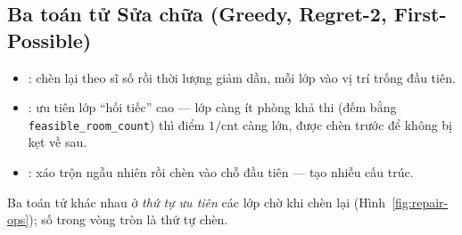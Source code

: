 \subsection{Ba toán tử Sửa chữa (Greedy, Regret-2, First-Possible)}
\begin{itemize}
  \item {}: chèn lại theo sĩ số rồi thời lượng giảm dần, mỗi lớp vào vị
  trí trống đầu tiên.
  \item {}: ưu tiên lớp ``hối tiếc'' cao --- lớp càng ít phòng khả thi
  (đếm bằng \texttt{feasible\_room\_count}) thì điểm $1/\text{cnt}$ càng lớn, được
  chèn trước để không bị kẹt về sau.
  \item {}: xáo trộn ngẫu nhiên rồi chèn vào chỗ đầu tiên --- tạo
  nhiễu cấu trúc.
\end{itemize}

Ba toán tử khác nhau ở \emph{thứ tự ưu tiên} các lớp chờ khi chèn lại
(Hình~\ref{fig:repair-ops}); số trong vòng tròn là thứ tự chèn.

